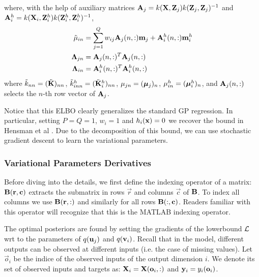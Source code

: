 where, with the help of auxiliary matrices $\mathbf{A}_j = k(\mathbf{X},\mathbf{Z}_j)k(\mathbf{Z}_j,\mathbf{Z}_j)^{-1}$ and  
$\mathbf{A}^h_i = k(\mathbf{X}_i,\mathbf{Z}^h_i)k(\mathbf{Z}^h_i,\mathbf{Z}^h_i)^{-1}$, 
\begin{align}
\tilde{\mu}_{in}
&= \sum_{j=1}^Q w_{ij} \mathbf{A}_j(n,:) \mathbf{m}_j + \mathbf{A}^h_i(n,:) \mathbf{m}^h_i \\
\mathbf{\Lambda}_{jn}
&= \mathbf{A}_j(n,:)^T \mathbf{A}_j(n,:)  \\
\mathbf{\Lambda}_{in}
&= \mathbf{A}^h_i(n,:)^T \mathbf{A}^h_i(n,:) 
\end{align}
where $\tilde{k}_{nn} = (\tilde{\mathbf{K}})_{nn}$, $\tilde{k}^h_{inn} = (\tilde{\mathbf{K}}^h_i)_{nn}$, $\mu_{jn} = (\boldsymbol{\mu}_j)_n$,  $\mu^h_{in} = (\boldsymbol{\mu}^h_i)_n$, and $\mathbf{A}_j(n,:)$ selects the $n$-th row vector of $\mathbf{A}_j$.

\noindent Notice that this ELBO clearly generalizes the standard GP regression. In particular, setting $P = Q = 1$, $w_i = 1$ and $h_i(\mathbf{x}) = 0$ we recover the bound in Hensman et al \citet{hensmangaussian}.
Due to the decomposition of this bound, we can use stochastic gradient descent to learn the variational parameters.

\subsubsection{Variational Parameters Derivatives}
\newcommand{\oi}{\vec{o}_i}
Before diving into the details, we first define the indexing operator of a matrix: $\mathbf{B}(\mathbf{r},\mathbf{c})$ extracts the submatrix in rows $\vec{r}$ and columns $\vec{c}$ of $\mathbf{B}$.
To index all columns we use $\mathbf{B}(\mathbf{r},:)$ and similarly for all rows $\mathbf{B}(:,\mathbf{c})$.
Readers familiar with this operator will recognize that this is the MATLAB indexing operator.

The optimal posteriors are found by setting the gradients of the lowerbound $\mathcal{L}$ wrt to the parameters of $q(\mathbf{u}_j)$ and $q(\mathbf{v}_i)$.
Recall that in the model, different outputs can be observed at different inputs (i.e. the case of missing values).
Let $\oi$ be the indice of the observed inputs of the output dimension $i$.
We denote its set of observed inputs and targets as: $\X_i = \X(\oi,:)$ and $\y_i = y_{i}(\oi)$.

